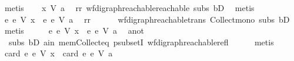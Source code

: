 \begin{isabellebody}
\ metis\isanewline
\ \ \isamarkupfalse%
\ {\isachardoublequoteopen}x\ {\isasymrightarrow}\isactrlsup {\isacharasterisk}{\kern0pt}\isactrlbsub V\isactrlesub \ a{\isachardoublequoteclose}\ \isamarkupfalse%
\ rr\ wf{\isacharunderscore}{\kern0pt}digraph{\isachardot}{\kern0pt}reachable{}{\isacharunderscore}{\kern0pt}reachable\ subs\ bD{}\ \isamarkupfalse%
\ metis\isanewline
\ \ \isamarkupfalse%
\ \isamarkupfalse%
\ {\isachardoublequoteopen}{\isacharbraceleft}{\kern0pt}e{\isachardot}{\kern0pt}\ e\ {\isasymrightarrow}\isactrlsup {\isacharasterisk}{\kern0pt}\isactrlbsub V\isactrlesub \ x{\isacharbraceright}{\kern0pt}\ {\isasymsubseteq}\ {\isacharbraceleft}{\kern0pt}e{\isachardot}{\kern0pt}\ e\ {\isasymrightarrow}\isactrlsup {\isacharasterisk}{\kern0pt}\isactrlbsub V\isactrlesub \ a{\isacharbraceright}{\kern0pt}{\isachardoublequoteclose}\ \isamarkupfalse%
\ rr\isanewline
\ \ \ \ \ \ wf{\isacharunderscore}{\kern0pt}digraph{\isachardot}{\kern0pt}reachable{\isacharunderscore}{\kern0pt}trans\ Collect{\isacharunderscore}{\kern0pt}mono\ subs\ bD{}\ \isamarkupfalse%
\ metis\isanewline
\ \ \isamarkupfalse%
\ \isamarkupfalse%
\ {\isachardoublequoteopen}{\isacharbraceleft}{\kern0pt}e{\isachardot}{\kern0pt}\ e\ {\isasymrightarrow}\isactrlsup {\isacharasterisk}{\kern0pt}\isactrlbsub V\isactrlesub \ x{\isacharbraceright}{\kern0pt}\ {\isasymsubset}\ {\isacharbraceleft}{\kern0pt}e{\isachardot}{\kern0pt}\ e\ {\isasymrightarrow}\isactrlsup {\isacharasterisk}{\kern0pt}\isactrlbsub V\isactrlesub \ a{\isacharbraceright}{\kern0pt}{\isachardoublequoteclose}\ \isamarkupfalse%
\ a{\isacharunderscore}{\kern0pt}not\isanewline
\ \ subs\ bD{}\ a{\isacharunderscore}{\kern0pt}in\ mem{\isacharunderscore}{\kern0pt}Collect{\isacharunderscore}{\kern0pt}eq\ psubsetI\ wf{\isacharunderscore}{\kern0pt}digraph{\isachardot}{\kern0pt}reachable{\isacharunderscore}{\kern0pt}refl\isanewline
\ \ \ \ \isamarkupfalse%
\ metis\ \isanewline
\ \ \isamarkupfalse%
\ \isamarkupfalse%
\ {\isachardoublequoteopen}card\ {\isacharbraceleft}{\kern0pt}e{\isachardot}{\kern0pt}\ e\ {\isasymrightarrow}\isactrlsup {\isacharasterisk}{\kern0pt}\isactrlbsub V\isactrlesub \ x{\isacharbraceright}{\kern0pt}\ {\isacharless}{\kern0pt}\ card\ {\isacharbraceleft}{\kern0pt}e{\isachardot}{\kern0pt}\ e\ {\isasymrightarrow}\isactrlsup {\isacharasterisk}{\kern0pt}\isactrlbsub V\isactrlesub \ a{\isacharbraceright}{\kern0pt}{\isachardoublequoteclose}\ \isamarkupfalse%

\end{isabellebody}
